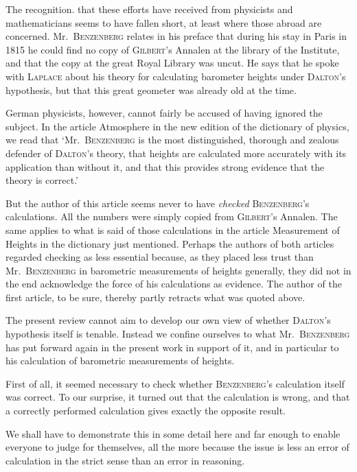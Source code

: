The recognition. that these efforts have received from physicists and mathematicians seems to have fallen short, at least where those abroad are concerned. Mr.\ \textsc{Benzenberg} relates in his preface that during his stay in Paris in 1815 he could find no copy of \textsc{Gilbert}’s Annalen at the library of the Institute, and that the copy at the great Royal Library was uncut. He says that he spoke with \textsc{Laplace} about his theory for calculating barometer heights under \textsc{Dalton}’s hypothesis, but that this great geometer was already old at the time.

German physicists, however, cannot fairly be accused of having ignored the subject. In the article Atmosphere in the new edition of the dictionary of physics, we read that ‘Mr.\ \textsc{Benzenberg} is the most distinguished, thorough and zealous defender of \textsc{Dalton}’s theory, that heights are calculated more accurately with its application than without it, and that this provides strong evidence that the theory is correct.’

But the author of this article seems never to have \textit{checked} \textsc{Benzenberg}’s calculations. All the numbers were simply copied from \textsc{Gilbert}’s Annalen. The same applies to what is said of those calculations in the article Measurement of Heights in the dictionary just mentioned. Perhaps the authors of both articles regarded checking as less essential because, as they placed less trust than Mr.\ \textsc{Benzenberg} in barometric measurements of heights generally, they did not in the end acknowledge the force of his calculations as evidence. The author of the first article, to be sure, thereby partly retracts what was quoted above.

The present review cannot aim to develop our own view of whether \textsc{Dalton}’s hypothesis itself is tenable. Instead we confine ourselves to what Mr.\
\textsc{Benzenberg} has put forward again in the present work in support of it, and in particular to his calculation of barometric measurements of heights.

First of all, it seemed necessary to check whether \textsc{Benzenberg}’s calculation itself was correct. To our surprise, it turned out that the calculation is wrong, and that a correctly performed calculation gives exactly the opposite result.

We shall have to demonstrate this in some detail here and far enough to enable everyone to judge for themselves, all the more because the issue is less an error of calculation in the strict sense than an error in reasoning.

